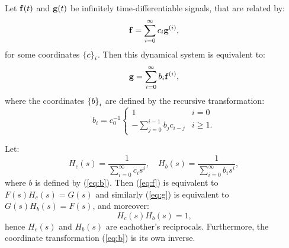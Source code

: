 \begin{theorem}
Let $\mathbf{f}(t)$ and $\mathbf{g}(t)$ be infinitely time-differentiable signals, that are related by:
\begin{equation} \label{eq:f}
\mathbf{f} = \sum_{i=0}^\infty c_i \mathbf{g}^{(i)} \text{,}
\end{equation}
for some coordinates $\left\{ c \right\}_{i}$. Then this dynamical system is equivalent to:
\begin{equation} \label{eq:g}
\mathbf{g} = \sum_{i=0}^\infty b_i \mathbf{f}^{(i)} \text{,}
\end{equation}
where the coordinates $\left\{ b \right\}_{i}$ are defined by the recursive transformation:
\begin{equation} \label{eq:b}
b_i = c_0^{-1} \begin{cases}
    1 & i = 0 \\
    - \sum_{j=0}^{i-1} b_j c_{i - j} & i \ge 1 \text{.}
  \end{cases}
\end{equation}
\end{theorem}

\begin{corollary}
Let: $$H_c(s) = \frac{1}{\sum_{i=0}^\infty c_i s^i}, \quad H_b(s) = \frac{1}{\sum_{i=0}^\infty b_i s^i}, $$ where $b$ is defined by (\ref{eq:b}). Then (\ref{eq:f}) is equivalent to $F(s)H_c(s) = G(s)$ and similarly (\ref{eq:g}) is equivalent to $G(s)H_b(s) = F(s)$, and moreover:
\begin{equation} \label{eq:inv}
H_c(s) H_b(s) = 1 \text{,}
\end{equation}
hence $H_c(s)$ and $H_b(s)$ are eachother's reciprocals. Furthermore, the coordinate transformation (\ref{eq:b}) is its own inverse.
\end{corollary}

